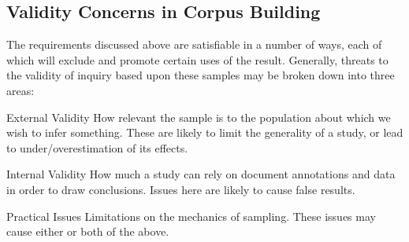 \subsection{Validity Concerns in Corpus Building}


The requirements discussed above are satisfiable in a number of ways, each of which will exclude and promote certain uses of the result.  Generally, threats to the validity of inquiry based upon these samples may be broken down into three areas:

\begin{itemizeTitle}
    \item[External Validity] How relevant the sample is to the population about which we wish to infer something.  These are likely to limit the generality of a study, or lead to under/overestimation of its effects.
    \item[Internal Validity] How much a study can rely on document annotations and data in order to draw conclusions.  Issues here are likely to cause false results.
    \item[Practical Issues] Limitations on the mechanics of sampling.  These issues may cause either or both of the above.
\end{itemizeTitle}













